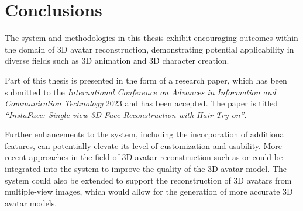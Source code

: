\section{Conclusions}\label{sec:conclusions}

The system and methodologies in this thesis exhibit encouraging outcomes within the domain of 3D avatar reconstruction, demonstrating potential applicability in diverse fields such as 3D animation and 3D character creation.

Part of this thesis is presented in the form of a research paper, which has been submitted to the \textit{International Conference on Advances in Information and Communication Technology} 2023 and has been accepted. The paper is titled \textit{``InstaFace: Single-view 3D Face Reconstruction with Hair Try-on''}. 

Further enhancements to the system, including the incorporation of additional features, can potentially elevate its level of customization and usability. More recent approaches in the field of 3D avatar reconstruction such as  or  could be integrated into the system to improve the quality of the 3D avatar model. The system could also be extended to support the reconstruction of 3D avatars from multiple-view images, which would allow for the generation of more accurate 3D avatar models.